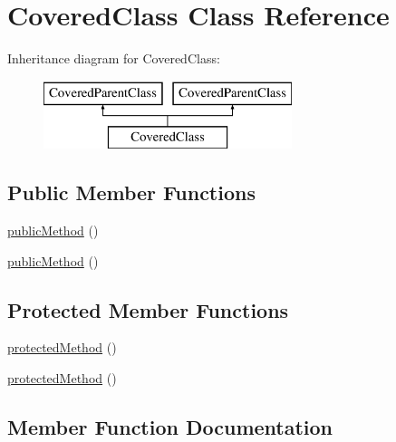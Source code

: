\hypertarget{class_foo_1_1_covered_class}{}\section{Covered\+Class Class Reference}
\label{class_foo_1_1_covered_class}
Inheritance diagram for Covered\+Class\+:\begin{figure}[H]
\begin{center}
\leavevmode
\includegraphics[height=2.000000cm]{class_foo_1_1_covered_class}
\end{center}
\end{figure}
\subsection*{Public Member Functions}
\begin{DoxyCompactItemize}
\item 
\mbox{\hyperlink{class_foo_1_1_covered_class_ab07dfd901b43d1dcdbc2d116d7f5a566}{public\+Method}} ()
\item 
\mbox{\hyperlink{class_foo_1_1_covered_class_ab07dfd901b43d1dcdbc2d116d7f5a566}{public\+Method}} ()
\end{DoxyCompactItemize}
\subsection*{Protected Member Functions}
\begin{DoxyCompactItemize}
\item 
\mbox{\hyperlink{class_foo_1_1_covered_class_ab718380de0530a34b65401f7e81a211f}{protected\+Method}} ()
\item 
\mbox{\hyperlink{class_foo_1_1_covered_class_ab718380de0530a34b65401f7e81a211f}{protected\+Method}} ()
\end{DoxyCompactItemize}


\subsection{Member Function Documentation}
\mbox{\label{class_foo_1_1_covered_class_ab718380de0530a34b65401f7e81a211f}} 
